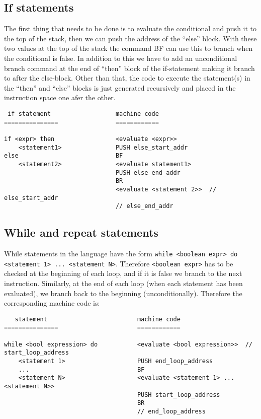 \documentclass[11pt]{article}
\begin{document}
\subsection{If statements}

The first thing that needs to be done is to evaluate the conditional and push it to the top of the stack, then we can push the address of the ``else'' block. With these two values at the top of the stack the command BF can use this to branch when the conditional is false. In addition to this we have to add an unconditional branch command at the end of ``then'' block of the if-statement making it branch to after the else-block. Other than that, the code to execute the statement(s) in the ``then'' and ``else'' blocks is just generated recursively and placed in the instruction space one afer the other.

\begin{verbatim}
 if statement                  machine code
===============                ============

if <expr> then                 <evaluate <expr>>
    <statement1>               PUSH else_start_addr
else                           BF
    <statement2>               <evaluate statement1>
                               PUSH else_end_addr
                               BR
                               <evaluate <statement 2>>  // else_start_addr
                               // else_end_addr
\end{verbatim}

\subsection{While and repeat statements}

While statements in the language have the form \texttt{while <boolean expr> do <statement 1> ... <statement N>}. Therefore \texttt{<boolean expr>} has to be checked at the beginning of each loop, and if it is false we branch to the next instruction. Similarly, at the end of each loop (when each statement has been evaluated), we branch back to the beginning (unconditionally). Therefore the corresponding machine code is:

\begin{verbatim}
   statement                         machine code
===============                      ============

while <bool expression> do           <evaluate <bool expression>>  // start_loop_address
    <statement 1>                    PUSH end_loop_address
    ...                              BF
    <statement N>                    <evaluate <statement 1> ... <statement N>>
                                     PUSH start_loop_address
                                     BR
                                     // end_loop_address
\end{verbatim}
\end{document}
